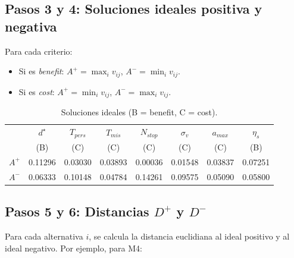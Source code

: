 \documentclass[12pt,a4paper,oneside]{book}
\begin{document}
\subsection{Pasos 3 y 4: Soluciones ideales positiva y negativa}

Para cada criterio:
\begin{itemize}
    \item Si es \emph{benefit}: $A^+ = \max_i v_{ij}$, $A^- = \min_i v_{ij}$.
    \item Si es \emph{cost}: $A^+ = \min_i v_{ij}$, $A^- = \max_i v_{ij}$.
\end{itemize}

\begin{table}[H]
\centering
\renewcommand{\arraystretch}{1.3}
\small
\begin{tabular}{lccccccc}
\toprule
& $d^\star$ & $T_{pers}$ & $T_{mis}$ & $N_{stop}$ & $\sigma_v$ & $a_{max}$ & $\eta_s$ \\
& (B) & (C) & (C) & (C) & (C) & (C) & (B) \\
\midrule
$A^+$ & 0.11296 & 0.03030 & 0.03893 & 0.00036 & 0.01548 & 0.03837 & 0.07251 \\
$A^-$ & 0.06333 & 0.10148 & 0.04784 & 0.14261 & 0.09575 & 0.05090 & 0.05800 \\
\bottomrule
\end{tabular}
\caption{Soluciones ideales (B = benefit, C = cost).}
\end{table}

\subsection{Pasos 5 y 6: Distancias $D^+$ y $D^-$}

Para cada alternativa $i$, se calcula la distancia euclidiana al ideal positivo y al ideal negativo. Por ejemplo, para M4:
\end{document}
